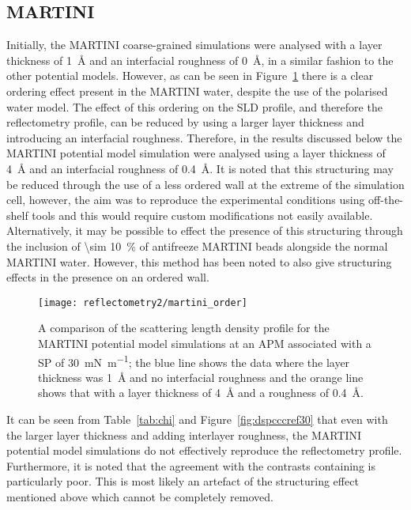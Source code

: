 \subsection{MARTINI}
\label{sec:martanal}
Initially, the MARTINI coarse-grained simulations were analysed with a layer thickness of \SI{1}{\angstrom} and an interfacial roughness of \SI{0}{\angstrom}, in a similar fashion to the other potential models.
However, as can be seen in Figure~\ref{fig:martorder} there is a clear ordering effect present in the MARTINI water, despite the use of the polarised water model.
The effect of this ordering on the SLD profile, and therefore the reflectometry profile, can be reduced by using a larger layer thickness and introducing an interfacial roughness.
Therefore, in the results discussed below the MARTINI potential model simulation were analysed using a layer thickness of \SI{4}{\angstrom} and an interfacial roughness of \SI{0.4}{\angstrom}.
It is noted that this structuring may be reduced through the use of a less ordered wall\autocite{koutsioubas_combined_2016} at the extreme of the simulation cell, however, the aim was to reproduce the experimental conditions using off-the-shelf tools and this would require custom modifications not easily available.
Alternatively, it may be possible to effect the presence of this structuring through the inclusion of \SI{\sim 10}{\percent} of antifreeze MARTINI beads alongside the normal MARTINI water.
However, this method has been noted to also give structuring effects in the presence on an ordered wall.\autocite{marrink_comment_2010}
%
\begin{figure}[t]
    \centering
    \texttt{[image: reflectometry2/martini\_order]}
    \caption{A comparison of the scattering length density profile for the MARTINI potential model simulations at an APM associated with a SP of \SI{30}{\milli\newton\per\meter}; the blue line shows the data where the layer thickness was \SI{1}{\angstrom} and no interfacial roughness and the orange line shows that with a layer thickness of \SI{4}{\angstrom} and a roughness of \SI{0.4}{\angstrom}.}
    \label{fig:martorder}
\end{figure}
%

It can be seen from Table~\ref{tab:chi} and Figure~\ref{fig:dspcccref30} that even with the larger layer thickness and adding interlayer roughness, the MARTINI potential model simulations do not effectively reproduce the reflectometry profile.
Furthermore, it is noted that the agreement with the contrasts containing  is particularly poor.
This is most likely an artefact of the structuring effect mentioned above which cannot be completely removed.

